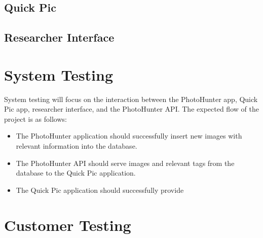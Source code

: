 \documentclass{article}
\begin{document}
\subsection{Quick Pic}
\subsection{Researcher Interface}
 

\section{System Testing}
System testing will focus on the interaction between the PhotoHunter app, Quick Pic app, researcher interface, and the PhotoHunter API. 
The expected flow of the project is as follows:
\begin{itemize}
\item The PhotoHunter application should successfully insert new images with relevant information into the database.
\item The PhotoHunter API should serve images and relevant tags from the database to the Quick Pic application.
\item The Quick Pic application should successfully provide 
\end{itemize}
\section{Customer Testing}
\end{document}
